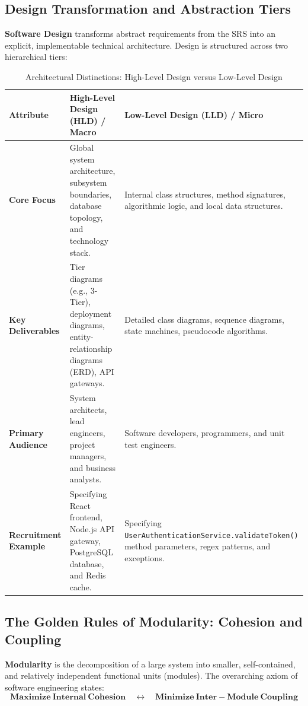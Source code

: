 \subsection{Design Transformation and Abstraction Tiers}
\textbf{Software Design} transforms abstract requirements from the SRS into an explicit, implementable technical architecture. Design is structured across two hierarchical tiers:
\begin{table}[htbp]
\centering
\small
\caption{Architectural Distinctions: High-Level Design versus Low-Level Design}
\label{tab:hld_vs_lld}
\begin{tabularx}{\textwidth}{l p{5cm} X}
\toprule
\textbf{Attribute} & \textbf{High-Level Design (HLD) / Macro} & \textbf{Low-Level Design (LLD) / Micro} \\
\midrule
\textbf{Core Focus} & Global system architecture, subsystem boundaries, database topology, and technology stack. & Internal class structures, method signatures, algorithmic logic, and local data structures. \\
\textbf{Key Deliverables} & Tier diagrams (e.g., 3-Tier), deployment diagrams, entity-relationship diagrams (ERD), API gateways. & Detailed class diagrams, sequence diagrams, state machines, pseudocode algorithms. \\
\textbf{Primary Audience} & System architects, lead engineers, project managers, and business analysts. & Software developers, programmers, and unit test engineers. \\
\textbf{Recruitment Example} & Specifying React frontend, Node.js API gateway, PostgreSQL database, and Redis cache. & Specifying \texttt{UserAuthenticationService.validateToken()} method parameters, regex patterns, and exceptions. \\
\bottomrule
\end{tabularx}
\end{table}

\subsection{The Golden Rules of Modularity: Cohesion and Coupling}
\textbf{Modularity} is the decomposition of a large system into smaller, self-contained, and relatively independent functional units (modules). The overarching axiom of software engineering states:
\begin{equation}
\boxed{\mathbf{Maximize\ Internal\ Cohesion} \quad \longleftrightarrow \quad \mathbf{Minimize\ Inter-Module\ Coupling}}
\end{equation}

